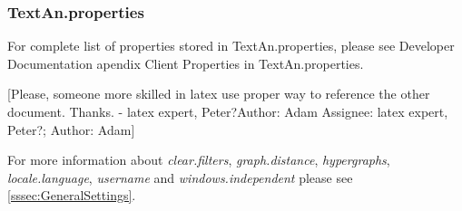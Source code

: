 \documentclass[12pt,a4paper]{report}
\makeatletter
\newcommand{\comment}[3][\@empty]{
  {\color{magenta}[#3 - }
  {\color{green}\ifx\@empty#1\relax Author: #2 \else Assignee: #1; Author: #2\fi}{\color{magenta}]}
}
\makeatother
\begin{document}
\subsubsection{TextAn.properties}

For complete list of properties stored in TextAn.properties, please see
Developer Documentation apendix Client Properties in TextAn.properties.

\comment[latex expert, Peter?]{Adam}{Please, someone more skilled in latex use
proper way to reference the other document. Thanks.}

For more information about \emph{clear.filters}, \emph{graph.distance},
\emph{hypergraphs}, \emph{locale.language}, \emph{username}
and \emph{windows.independent} please see \ref{sssec:GeneralSettings}.
\end{document}
